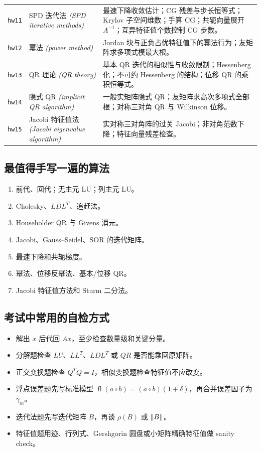 \documentclass{article}
\newcommand{\fl}{\operatorname{fl}}
\newcommand{\eng}[1]{\texorpdfstring{{\normalfont\rmfamily\itshape\textcolor{blue!65!black}{(#1)}}}{(#1)}}
\begin{document}
\begin{longtable}{@{}p{1.4cm}p{4.1cm}p{8.5cm}@{}}
\texttt{hw11} & SPD 迭代法 \eng{SPD iterative methods} & 最速下降收敛估计；CG 残差与步长恒等式；Krylov 子空间维数；手算 CG；共轭向量展开 $A^{-1}$；互异特征值个数控制 CG 步数。\\
\texttt{hw12} & 幂法 \eng{power method} & Jordan 块与正负占优特征值下的幂法行为；友矩阵求多项式模最大根。\\
\texttt{hw13} & QR 理论 \eng{QR theory} & 基本 QR 迭代的相似性与收敛限制；Hessenberg 化；不可约 Hessenberg 的结构；位移 QR 的乘积恒等式。\\
\texttt{hw14} & 隐式 QR \eng{implicit QR algorithm} & 一般实矩阵隐式 QR；友矩阵求高次多项式全部根；对称三对角 QR 与 Wilkinson 位移。\\
\texttt{hw15} & Jacobi 特征值法 \eng{Jacobi eigenvalue algorithm} & 实对称三对角阵的过关 Jacobi；非对角范数下降；特征向量残差检查。\\
\bottomrule
\end{longtable}

\subsection{最值得手写一遍的算法}

\begin{enumerate}
  \item 前代、回代；无主元 LU；列主元 LU。
  \item Cholesky、$LDL^T$、追赶法。
  \item Householder QR 与 Givens 消元。
  \item Jacobi、Gauss--Seidel、SOR 的迭代矩阵。
  \item 最速下降和共轭梯度。
  \item 幂法、位移反幂法、基本/位移 QR。
  \item Jacobi 特征值方法和 Sturm 二分法。
\end{enumerate}

\subsection{考试中常用的自检方式}

\begin{itemize}
  \item 解出 $x$ 后代回 $Ax$，至少检查数量级和关键分量。
  \item 分解题检查 $LU$、$LL^T$、$LDL^T$ 或 $QR$ 是否能乘回原矩阵。
  \item 正交变换题检查 $Q^TQ=I$，相似变换题检查特征值不应改变。
  \item 浮点误差题先写标准模型 $\fl(a\circ b)=(a\circ b)(1+\delta)$，再合并误差因子为 $\gamma_m$。
  \item 迭代法题先写迭代矩阵 $B$，再谈 $\rho(B)$ 或 $\left\| B \right\|$。
  \item 特征值题用迹、行列式、Gershgorin 圆盘或小矩阵精确特征值做 sanity check。
\end{itemize}
\end{document}
